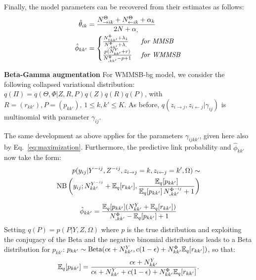Finally, the model parameters can be recovered from their estimates as follows:
%
\begin{align*}
\hat \theta_{ik} &= \frac{N^{\Theta}_{\rightarrow ik} + N^{\Theta}_{\leftarrow ik} + \alpha_k}{2N + \alpha_{\bm{.}}} \\
\hat \phi_{kk'}&=\begin{cases}
     \frac{N^{\Phi}_{1 kk'} + \lambda_1}{N^{\Phi}_{\bm{.}kk'} + \lambda_{\bm{.}}} & \textrm{ \textit{for MMSB}} \\
    \frac{p(N^Y_{kk'} + r)}{N^{\Phi}_{\bm{.}kk'} - p + 1}  & \textrm{ \textit{for WMMSB}}  %
    \end{cases}
\end{align*}

\textbf{Beta-Gamma augmentation} For WMMSB-bg model, we consider the following collapsed variational distribution: $q(\Pi) = q(\Theta, \Phi|Z, R, P)q(Z)q(R)q(P)$,
with $R=(r_{kk'}), P=(p_{kk'}), \, 1 \le k,k' \le K$. As before, $q(z_{i \rightarrow j}, z_{i \leftarrow j}|\gamma_{ij})$ is multinomial with parameter $\gamma_{ij}$.

The same development as above applies for the parameters $\gamma_{ijkk'}$, given here also by Eq.~\ref{eq:maximization}. Furthermore, the predictive link probability and $\hat \phi_{kk'}$ now take the form:
%
\begin{align*}
p(y_{ij} | Y^{-ij}, Z^{- ij}, z_{i\rightarrow j}=k, z_{i\leftarrow j}=k',\Omega) \sim \\
\mathrm{NB}\left(y_{ij}; N^{Y^{-ij}}_{kk'} + \mathbb{E}_{q}[r_{kk'}], \frac{\mathbb{E}_{q}[p_{kk'}]}{\mathbb{E}_{q}[p_{kk'}]\,N^{\Phi^{-ij}}_{\bm{.}kk'} + 1} \right)
\end{align*}

\begin{align*}
\hat \phi_{kk'} = \frac{\mathbb{E}_{q}[p_{kk'}](N^Y_{kk'} + \mathbb{E}_{q}[r_{kk'}])}{N^{\Phi}_{\bm{.}kk'} - \mathbb{E}_{q}[p_{kk'}] + 1}
\end{align*}
%
Setting $q(P) = p(P|Y,Z,\Omega)$ where $p$ is the true distribution and exploiting the conjugacy of the Beta and the negative binomial distributions leads to a Beta distribution for $p_{kk'}$: $p_{kk'} \sim \textrm{Beta}(c\epsilon + N^Y_{kk'}, c(1-\epsilon) + N^\Phi_{kk'}\mathbb{E}_{q}[r_{kk'}])$,
so that:
\[
\mathbb{E}_{q}[p_{kk'}] = \frac{c\epsilon + N^Y_{kk'}}{c\epsilon + N^Y_{kk'} + c(1-\epsilon) + N^\Phi_{kk'}\mathbb{E}_{q}[r_{kk'}]}.
\]

